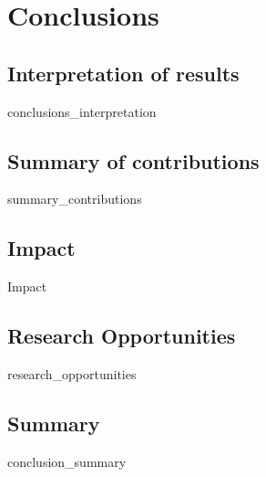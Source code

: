 \chapter{Conclusions}

\section{Interpretation of results}
{conclusions_interpretation}
\clearpage

\section{Summary of contributions}
{summary_contributions}
\clearpage

\section{Impact}
{Impact}
\clearpage

\section{Research Opportunities}
{research_opportunities}
\clearpage

\section{Summary}
{conclusion_summary}
\clearpage